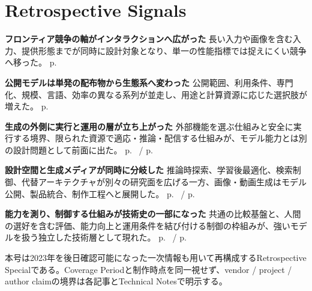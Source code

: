 \section*{Retrospective Signals}
\smallskip
\noindent\textbf{フロンティア競争の軸がインタラクションへ広がった} 長い入力や画像を含む入力、提供形態までが同時に設計対象となり、単一の性能指標では捉えにくい競争へ移った。 \hfill{\footnotesize p.~\pageref{pkg:frontier-interface}}\par
\smallskip
\noindent\textbf{公開モデルは単発の配布物から生態系へ変わった} 公開範囲、利用条件、専門化、規模、言語、効率の異なる系列が並走し、用途と計算資源に応じた選択肢が増えた。 \hfill{\footnotesize p.~\pageref{pkg:open-weight-ecosystem}}\par
\smallskip
\noindent\textbf{生成の外側に実行と運用の層が立ち上がった} 外部機能を選ぶ仕組みと安全に実行する境界、限られた資源で適応・推論・配信する仕組みが、モデル能力とは別の設計問題として前面に出た。 \hfill{\footnotesize p.~\pageref{pkg:tool-action-layer} / p.~\pageref{pkg:runtime-adaptation}}\par
\smallskip
\noindent\textbf{設計空間と生成メディアが同時に分岐した} 推論時探索、学習後最適化、検索制御、代替アーキテクチャが別々の研究面を広げる一方、画像・動画生成はモデル公開、製品統合、制作工程へと展開した。 \hfill{\footnotesize p.~\pageref{pkg:reasoning-retrieval-architecture} / p.~\pageref{pkg:generative-media}}\par
\smallskip
\noindent\textbf{能力を測り、制御する仕組みが技術史の一部になった} 共通の比較基盤と、人間の選好を含む評価、能力向上と運用条件を結び付ける制御の枠組みが、強いモデルを扱う独立した技術層として現れた。 \hfill{\footnotesize p.~\pageref{pkg:evaluation-control} / p.~\pageref{pkg:annual-synthesis}}\par
\medskip
\begin{claimboundary}
本号は2023年を後日確認可能になった一次情報も用いて再構成するRetrospective Specialである。Coverage Periodと制作時点を同一視せず、vendor / project / author claimの境界は各記事とTechnical Notesで明示する。
\end{claimboundary}
\medskip
\setcounter{tocdepth}{1}
\tableofcontents
